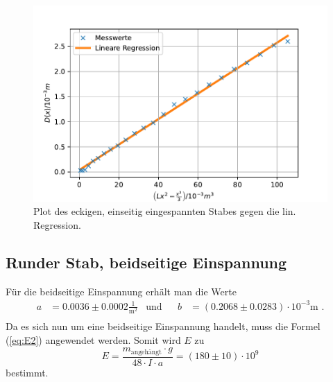 \begin{figure}[H]
  \centering
  \includegraphics{pictures/Lineare Regression2.pdf}
  \caption{Plot des eckigen, einseitig eingespannten Stabes gegen die lin. Regression.}
  \label{fig:plot2}
\end{figure}


\subsection{Runder Stab, beidseitige Einspannung}

Für die beidseitige Einspannung erhält man die Werte
\begin{align*}
  a &= 0.0036 ± 0.0002 \frac{1}{\unit{\meter\squared}} & \text{und}& & b&= (0.2068 ± 0.0283) \cdot 10^{-3} \unit\meter \text{ .} \\
\end{align*}
Da es sich nun um eine beidseitige Einspannung handelt, muss die Formel (\ref{eq:E2}) angewendet werden.
Somit wird $E$ zu
\begin{equation*}
  E = \frac{m_\text{angehängt} \cdot g}{48 \cdot I \cdot a} = (180 \pm 10) \cdot 10^{9}
\end{equation*}
bestimmt.




